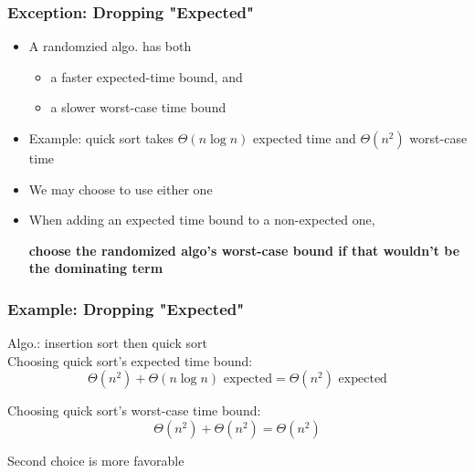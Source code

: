 \documentclass{beamer}
\begin{document}
\begin{frame} \frametitle{Exception: Dropping "Expected"}
  \begin{itemize}
    \item A randomzied algo. has both
    \begin{itemize}
      \item a faster expected-time bound, and
      \item a slower worst-case time bound
    \end{itemize}
    \item Example: quick sort takes $\Theta(n \log n)$ expected time and $\Theta(n^2)$ worst-case time
    \item We may choose to use either one
    \item When adding an expected time bound to a non-expected one,
      \begin{center}\textbf{choose the randomized algo's worst-case bound if that wouldn't be the dominating term}\end{center}
  \end{itemize}
\end{frame}

\begin{frame} \frametitle{Example: Dropping "Expected"}
  Algo.: insertion sort then quick sort 
  \\

  Choosing quick sort's expected time bound:
  \[  \Theta(n^2) + \Theta(n \log n)\text{ expected} = \Theta(n^2)\text{ expected} \]

  Choosing quick sort's worst-case time bound:
  \[  \Theta(n^2) + \Theta(n^2) = \Theta(n^2) \]

  Second choice is more favorable
\end{frame}
  
\end{document}
